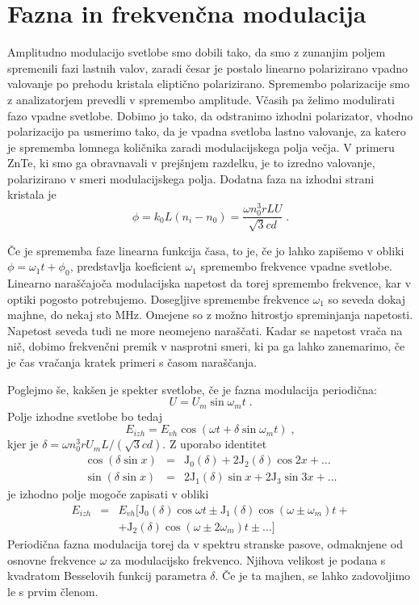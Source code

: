 \section{Fazna in frekvenčna modulacija}

Amplitudno modulacijo svetlobe smo dobili tako, da smo z zunanjim
poljem spremenili fazi lastnih valov, zaradi česar je postalo linearno
polarizirano vpadno valovanje po prehodu kristala eliptično polarizirano.
Spremembo polarizacije smo z analizatorjem prevedli v spremembo amplitude.
Včasih pa želimo modulirati fazo vpadne svetlobe. Dobimo jo tako,
da odstranimo izhodni polarizator, vhodno polarizacijo pa usmerimo
tako, da je vpadna svetloba lastno valovanje, za katero je sprememba
lomnega količnika zaradi modulacijskega polja večja. V primeru ZnTe,
ki smo ga obravnavali v prejšnjem razdelku, je to izredno valovanje,
polarizirano v smeri modulacijskega polja. Dodatna faza na izhodni
strani kristala je 
\begin{equation}
\phi=k_{0}L(n_{i}-n_{0})=\frac{\omega n_{0}^{3}rLU}{\sqrt{3}cd}\;.\label{7.20}
\end{equation}


Če je sprememba faze linearna funkcija časa, to je, če jo lahko zapišemo
v obliki $\phi=\omega_{1}t+\phi_{0}$, predstavlja koeficient $\omega_{1}$
spremembo frekvence vpadne svetlobe. Linearno naraščajoča modulacijska
napetost da torej spremembo frekvence, kar v optiki pogosto potrebujemo.
Dosegljive spremembe frekvence $\omega_{1}$ so seveda dokaj majhne,
do nekaj sto MHz. Omejene so z možno hitrostjo spreminjanja napetosti.
Napetost seveda tudi ne more neomejeno naraščati. Kadar se napetost
vrača na nič, dobimo frekvenčni premik v nasprotni smeri, ki pa ga
lahko zanemarimo, če je čas vračanja kratek primeri s časom naraščanja.

Poglejmo še, kakšen je spekter svetlobe, če je fazna modulacija periodična:
\begin{equation}
U=U_{m}\sin\omega_{m}t\;.\label{7.21}
\end{equation}
 Polje izhodne svetlobe bo tedaj 
\begin{equation}
E_{izh}=E_{vh}\cos(\omega t+\delta\sin\omega_{m}t)\;,\label{7.22}
\end{equation}
 kjer je $\delta=\omega n_{0}^{3}rU_{m}L/(\sqrt{3}cd)$. Z uporabo
identitet 
\begin{eqnarray}
\cos(\delta\sin x) & = & \mbox{J}_{0}(\delta)+2\mbox{J}_{2}(\delta)\cos2x+\ldots\nonumber \\
\sin(\delta\sin x) & = & 2\mbox{J}_{1}(\delta)\sin x+2\mbox{J}_{3}\sin3x+\ldots
\end{eqnarray}
 je izhodno polje mogoče zapisati v obliki 
\begin{eqnarray}
E_{izh} & = & E_{vh}[\mbox{J}_{0}(\delta)\cos\omega t\pm\mbox{J}_{1}(\delta)\cos(\omega\pm\omega_{m})t+\nonumber \\
 &  & +\mbox{J}_{2}(\delta)\cos(\omega\pm2\omega_{m})t\pm\ldots]
\end{eqnarray}
 Periodična fazna modulacija torej da v spektru stranske pasove, odmaknjene
od osnovne frekvence $\omega$ za modulacijsko frekvenco. Njihova
velikost je podana s kvadratom Besselovih funkcij parametra $\delta$.
Če je ta majhen, se lahko zadovoljimo le s prvim členom.



